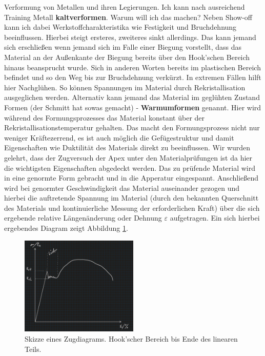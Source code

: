 Verformung von Metallen und ihren Legierungen.
Ich kann nach ausreichend Training Metall \textbf{kaltverformen}. Warum will ich das machen? Neben Show-off kann ich dabei Werkstoffcharakteristika
wie Festigkeit und Bruchdehnung beeinflussen. Hierbei steigt ersteres, zweiteres sinkt allerdings. Das kann jemand sich
erschließen wenn jemand sich im Falle einer Biegung vorstellt, dass das Material an der Außenkante der Biegung bereits über
den Hook'schen Bereich hinaus beansprucht wurde. Sich in anderen Worten bereits im plastischen Bereich befindet und so
den Weg bis zur Bruchdehnung verkürzt. In extremen Fällen hilft hier Nachglühen. So können Spannungen im Material durch
Rekristallisation ausgeglichen werden.
Alternativ kann jemand das Material im geglühten Zustand Formen (der Schmitt hat sowas gemacht) - \textbf{Warmumformen} genannt.
Hier wird während des Formungsprozesses das Material konstant über der Rekristallisationstemperatur gehalten. Das macht
den Formungsprozess nicht nur weniger Kräftezerrend, es ist auch möglich die Gefügestruktur und damit Eigenschaften wie
Duktilität des Materials direkt zu beeinflussen.
Wir wurden gelehrt, dass der Zugversuch der Apex unter den Materialprüfungen ist da hier die wichtigsten Eigenschaften
abgedeckt werden. Das zu prüfende Material wird in eine genormte Form gebracht und in die Apperatur eingespannt. Anschließend
wird bei genormter Geschwindigkeit das Material auseinander gezogen und hierbei die auftretende Spannung im Material
(durch den bekannten Querschnitt des Materials und kontinuierliche Messung der erforderlichen Kraft) über die sich
ergebende relative Längenänderung oder Dehnung \(\varepsilon \) aufgetragen. Ein sich hierbei ergebendes Diagram zeigt
Abbildung \ref{fig:luedi}.
\begin{figure}[h]
    \centering
    \includegraphics[width=0.5\textwidth]{entries/6/luedi.jpg}
    \caption{Skizze eines Zugdiagrams. Hook'scher Bereich bis Ende des linearen Teils.}
    \label{fig:luedi}
\end{figure}
